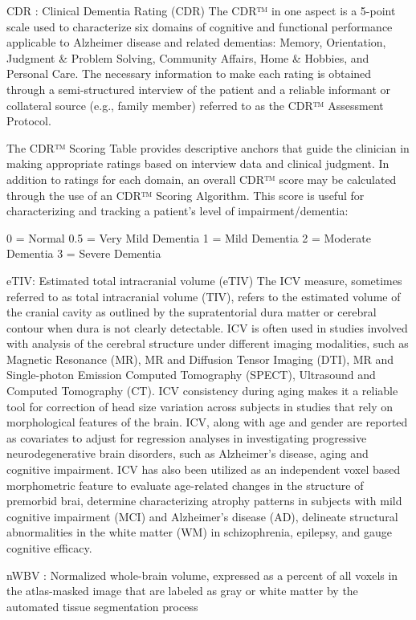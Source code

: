 \documentclass[
]{article}
\begin{document}
CDR : Clinical Dementia Rating (CDR) The CDR™ in one aspect is a 5-point
scale used to characterize six domains of cognitive and functional
performance applicable to Alzheimer disease and related dementias:
Memory, Orientation, Judgment \& Problem Solving, Community Affairs,
Home \& Hobbies, and Personal Care. The necessary information to make
each rating is obtained through a semi-structured interview of the
patient and a reliable informant or collateral source (e.g., family
member) referred to as the CDR™ Assessment Protocol.

The CDR™ Scoring Table provides descriptive anchors that guide the
clinician in making appropriate ratings based on interview data and
clinical judgment. In addition to ratings for each domain, an overall
CDR™ score may be calculated through the use of an CDR™ Scoring
Algorithm. This score is useful for characterizing and tracking a
patient's level of impairment/dementia:

0 = Normal 0.5 = Very Mild Dementia 1 = Mild Dementia 2 = Moderate
Dementia 3 = Severe Dementia

eTIV: Estimated total intracranial volume (eTIV) The ICV measure,
sometimes referred to as total intracranial volume (TIV), refers to the
estimated volume of the cranial cavity as outlined by the supratentorial
dura matter or cerebral contour when dura is not clearly detectable. ICV
is often used in studies involved with analysis of the cerebral
structure under different imaging modalities, such as Magnetic Resonance
(MR), MR and Diffusion Tensor Imaging (DTI), MR and Single-photon
Emission Computed Tomography (SPECT), Ultrasound and Computed Tomography
(CT). ICV consistency during aging makes it a reliable tool for
correction of head size variation across subjects in studies that rely
on morphological features of the brain. ICV, along with age and gender
are reported as covariates to adjust for regression analyses in
investigating progressive neurodegenerative brain disorders, such as
Alzheimer's disease, aging and cognitive impairment. ICV has also been
utilized as an independent voxel based morphometric feature to evaluate
age-related changes in the structure of premorbid brai, determine
characterizing atrophy patterns in subjects with mild cognitive
impairment (MCI) and Alzheimer's disease (AD), delineate structural
abnormalities in the white matter (WM) in schizophrenia, epilepsy, and
gauge cognitive efficacy.

nWBV : Normalized whole-brain volume, expressed as a percent of all
voxels in the atlas-masked image that are labeled as gray or white
matter by the automated tissue segmentation process
\end{document}
